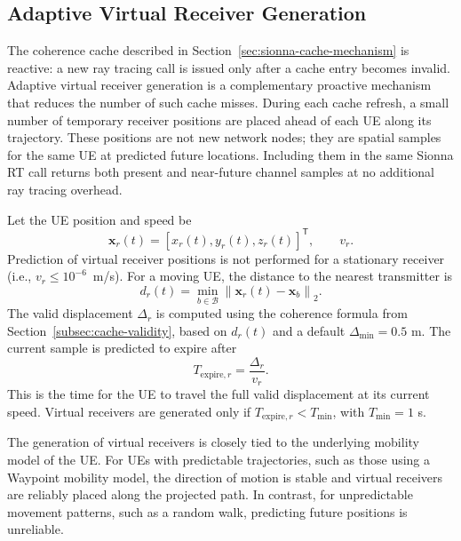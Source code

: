 \subsection{Adaptive Virtual Receiver Generation}
\label{subsec:adaptive-virtual-rx-generation}

The coherence cache described in Section~\ref{sec:sionna-cache-mechanism} is reactive: a new ray tracing call is issued only after a cache entry becomes invalid.
Adaptive virtual receiver generation is a complementary proactive mechanism that reduces the number of such cache misses.
During each cache refresh, a small number of temporary receiver positions are placed ahead of each UE along its trajectory.
These positions are not new network nodes; they are spatial samples for the same UE at predicted future locations.
Including them in the same Sionna RT call returns both present and near-future channel samples at no additional ray tracing overhead.

Let the UE position and speed be
\begin{equation}
    \mathbf{x}_r(t)=[x_r(t),y_r(t),z_r(t)]^{\mathsf{T}},
    \qquad v_r .
\end{equation}
Prediction of virtual receiver positions is not performed for a stationary receiver (i.e., $v_r \leq 10^{-6}$~m/s).
For a moving UE, the distance to the nearest transmitter is
\begin{equation}
    d_r(t)=\min_{b\in\mathcal{B}}
    \left\|\mathbf{x}_r(t)-\mathbf{x}_b\right\|_2 .
\end{equation}
The valid displacement $\Delta_r$ is computed using the coherence formula
from Section~\ref{subsec:cache-validity}, based on $d_r(t)$ and a default
$\Delta_{\min}=0.5$ m.
The current sample is predicted to expire after
\begin{equation}
    T_{\mathrm{expire},r}=\frac{\Delta_r}{v_r}.
\end{equation}
This is the time for the UE to travel the full valid displacement at its current speed.
Virtual receivers are generated only if $T_{\mathrm{expire},r}<T_{\min}$, with $T_{\min}=1$ s.

The generation of virtual receivers is closely tied to the underlying mobility model of the UE.
For UEs with predictable trajectories, such as those using a Waypoint mobility model, the direction of motion is stable and virtual receivers are reliably placed along the projected path.
In contrast, for unpredictable movement patterns, such as a random walk, predicting future positions is unreliable.

